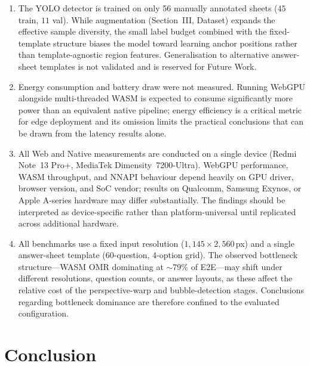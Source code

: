 \documentclass[conference]{IEEEtran}
\begin{document}
\begin{enumerate}[label=(\roman*), leftmargin=*, itemsep=2pt, topsep=4pt]
    handwriting style, pen pressure, and mark-intensity distribution
    of evaluation writers during training, potentially inflating the
    reported 96.4\% accuracy.
    The magnitude of this inflation is unknown without a writer-disjoint
    experiment; generalisation to unseen writers, diverse devices, and
    adverse lighting is not yet validated.
    A writer-disjoint dataset is in preparation.
  \item The YOLO detector is trained on only 56 manually annotated
    sheets ($45$ train, $11$ val). While augmentation
    (Section~III, Dataset) expands the effective sample diversity,
    the small label budget combined with the fixed-template structure
    biases the model toward learning anchor positions rather than
    template-agnostic region features. Generalisation to alternative
    answer-sheet templates is not validated and is reserved for
    Future Work.
  \item Energy consumption and battery draw were not measured.
    Running WebGPU alongside multi-threaded WASM is expected to consume
    significantly more power than an equivalent native pipeline;
    energy efficiency is a critical metric for edge deployment and
    its omission limits the practical conclusions that can be drawn
    from the latency results alone.
  \item All Web and Native measurements are conducted on a single
    device (Redmi Note~13 Pro+, MediaTek Dimensity~7200-Ultra).
    WebGPU performance, WASM throughput, and NNAPI behaviour depend
    heavily on GPU driver, browser version, and SoC vendor; results
    on Qualcomm, Samsung Exynos, or Apple A-series hardware may differ
    substantially. The findings should be interpreted as
    device-specific rather than platform-universal until replicated
    across additional hardware.
  \item All benchmarks use a fixed input resolution ($1{,}145\times2{,}560$\,px)
    and a single answer-sheet template (60-question, 4-option grid).
    The observed bottleneck structure---WASM OMR dominating at $\sim$79\%
    of E2E---may shift under different resolutions, question counts, or
    answer layouts, as these affect the relative cost of the perspective-warp
    and bubble-detection stages. Conclusions regarding bottleneck dominance
    are therefore confined to the evaluated configuration.
\end{enumerate}

\section{Conclusion}
\end{document}
